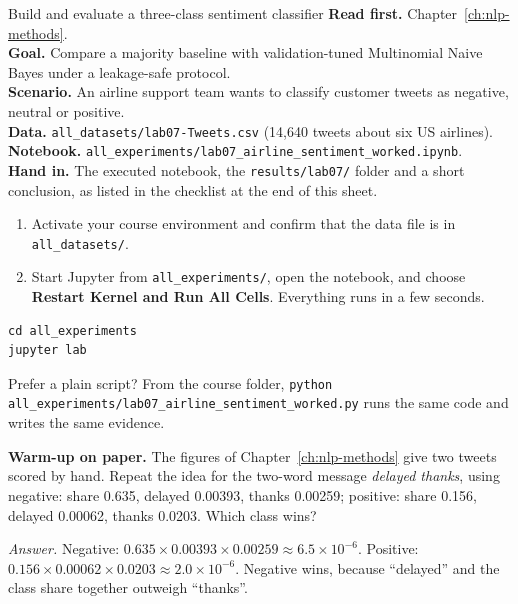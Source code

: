 
\begin{labproject}{Build and evaluate a three-class sentiment classifier}
\textbf{Read first.} Chapter~\ref{ch:nlp-methods}.\\
\textbf{Goal.} Compare a majority baseline with validation-tuned Multinomial Naive Bayes under a leakage-safe protocol.\\
\textbf{Scenario.} An airline support team wants to classify customer tweets as negative, neutral or positive.\\
\textbf{Data.} \texttt{all\_datasets/lab07-Tweets.csv} (14,640 tweets about six US airlines).\\
\textbf{Notebook.} \texttt{all\_experiments/lab07\_airline\_sentiment\_worked.ipynb}.\\
\textbf{Hand in.} The executed notebook, the \texttt{results/lab07/} folder and a short conclusion, as listed in the checklist at the end of this sheet.
\end{labproject}

\begin{labmode}
\begin{enumerate}
  \item Activate your course environment and confirm that the data file is in \texttt{all\_datasets/}.
  \item Start Jupyter from \texttt{all\_experiments/}, open the notebook, and choose \textbf{Restart Kernel and Run All Cells}. Everything runs in a few seconds.
\end{enumerate}
\begin{lstlisting}[style=utpterminal]
cd all_experiments
jupyter lab
\end{lstlisting}
Prefer a plain script? From the course folder, \texttt{python all\_experiments/lab07\_airline\_sentiment\_worked.py} runs the same code and writes the same evidence.
\end{labmode}



\labroutine

\begin{yourturn}
\textbf{Warm-up on paper.} The figures of Chapter~\ref{ch:nlp-methods} give two tweets scored by hand. Repeat the idea for the two-word message \emph{delayed thanks}, using negative: share 0.635, delayed 0.00393, thanks 0.00259; positive: share 0.156, delayed 0.00062, thanks 0.0203. Which class wins?

\emph{Answer.} Negative: $0.635\times0.00393\times0.00259\approx6.5\times10^{-6}$. Positive: $0.156\times0.00062\times0.0203\approx2.0\times10^{-6}$. Negative wins, because ``delayed'' and the class share together outweigh ``thanks''.
\end{yourturn}

